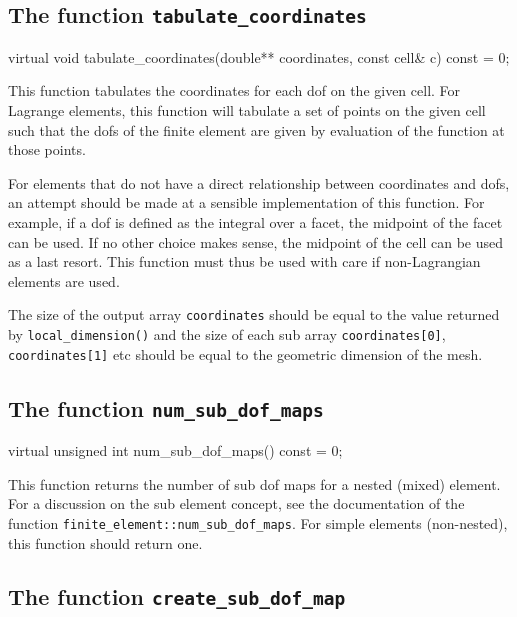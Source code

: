 \subsection{The function \texttt{tabulate\_coordinates}}

\begin{code}
virtual void tabulate_coordinates(double** coordinates,
                                  const cell& c) const = 0;
\end{code}

This function tabulates the coordinates for each dof on the given
cell. For Lagrange elements, this function will tabulate a set of
points on the given cell such that the dofs of the finite element are
given by evaluation of the function at those points.

For elements that do not have a direct relationship between
coordinates and dofs, an attempt should be made at a sensible
implementation of this function. For example, if a dof is defined as
the integral over a facet, the midpoint of the facet can be used. If
no other choice makes sense, the midpoint of the cell can be used as a
last resort. This function must thus be used with care if
non-Lagrangian elements are used.

The size of the output array \texttt{coordinates} should be equal to
the value returned by \texttt{local\_dimension()} and the size of each
sub array \texttt{coordi\-nates[0]}, \texttt{coordinates[1]} etc should
be equal to the geometric dimension of the mesh.

\subsection{The function \texttt{num\_sub\_dof\_maps}}

\begin{code}
virtual unsigned int num_sub_dof_maps() const = 0;
\end{code}

This function returns the number of sub dof maps for a nested (mixed)
element. For a discussion on the sub element concept, see the
documentation of the function
\texttt{finite\_element::num\_sub\_dof\_maps}. For simple elements
(non-nested), this function should return one.

\subsection{The function \texttt{create\_sub\_dof\_map}}

